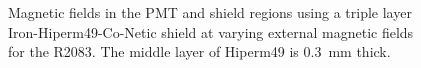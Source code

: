 \documentclass[12pt]{article}
\begin{document}
\begin{figure}[ht]
\qquad
{}
\caption{\small{Magnetic fields in the PMT and shield regions using a triple layer Iron-Hiperm49-Co-Netic shield at varying external magnetic fields for the R2083. The middle layer of Hiperm49 is 0.3~mm thick.}}\label{R2083_Initial_Iron}
\end{figure}
\end{document}
